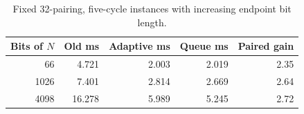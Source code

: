 \begin{table}[htbp]
\centering
\small
\begin{tabular}{rrrrr}
\toprule
Bits of $N$ & Old ms & Adaptive ms & Queue ms & Paired gain \\
\midrule
66 & 4.721 & 2.003 & 2.019 & 2.35 \\
1026 & 7.401 & 2.814 & 2.669 & 2.64 \\
4098 & 16.278 & 5.989 & 5.245 & 2.72 \\
\bottomrule
\end{tabular}
\caption{Fixed 32-pairing, five-cycle instances with increasing endpoint bit length.}
\label{tab:binary}
\end{table}
